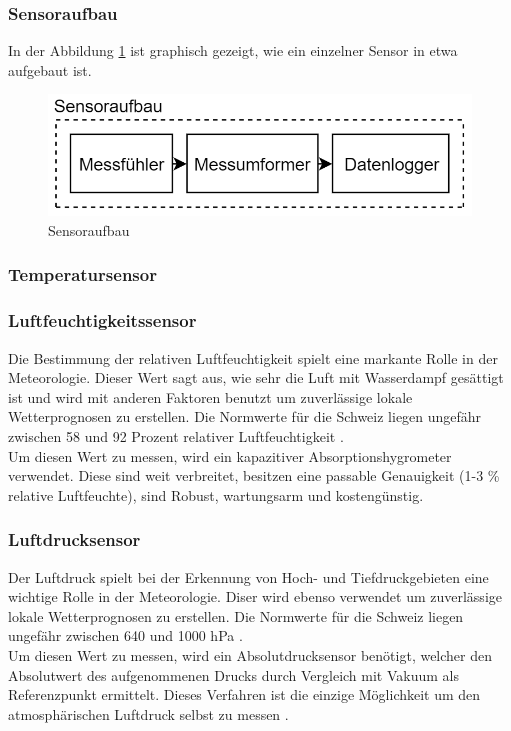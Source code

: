 \subsubsection*{Sensoraufbau}
In der Abbildung \ref{fig:sensoraufbau} ist graphisch gezeigt, wie ein einzelner Sensor in etwa aufgebaut ist. 
\begin{figure}[h]
\centering
\includegraphics[scale=0.7]{graphics/Sensoraufbau.PNG}
\caption{Sensoraufbau}
\label{fig:sensoraufbau}
\end{figure}

\subsubsection{Temperatursensor}

\subsubsection{Luftfeuchtigkeitssensor}
Die Bestimmung der relativen Luftfeuchtigkeit spielt eine markante Rolle in der Meteorologie. Dieser Wert sagt aus, wie sehr die Luft mit Wasserdampf gesättigt ist und wird mit anderen Faktoren benutzt um zuverlässige lokale Wetterprognosen zu erstellen. Die Normwerte für die Schweiz liegen ungefähr zwischen 58 und 92 Prozent relativer Luftfeuchtigkeit  \cite{MeteoSchweizFeuchte}.\\
Um diesen Wert zu messen, wird ein kapazitiver Absorptionshygrometer verwendet. Diese sind weit verbreitet, besitzen eine passable Genauigkeit (1-3 \% relative Luftfeuchte), sind Robust, wartungsarm und kostengünstig.

\subsubsection{Luftdrucksensor}
Der Luftdruck spielt bei der Erkennung von Hoch- und Tiefdruckgebieten eine wichtige Rolle in der Meteorologie. Diser wird ebenso verwendet um zuverlässige lokale Wetterprognosen zu erstellen. Die Normwerte für die Schweiz liegen ungefähr zwischen 640 und 1000 hPa \cite{MeteoSchweizDruck}.\\
Um diesen Wert zu messen, wird ein Absolutdrucksensor benötigt, welcher den Absolutwert des aufgenommenen Drucks durch Vergleich mit Vakuum als Referenzpunkt ermittelt. Dieses Verfahren ist die einzige Möglichkeit um den atmosphärischen Luftdruck selbst zu messen \cite{WikiDruck}. 

